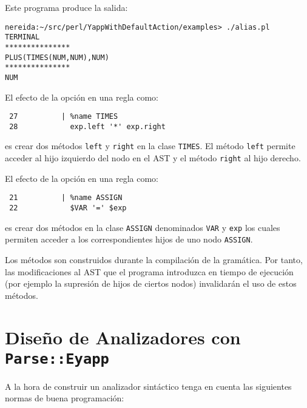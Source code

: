 Este programa produce la salida:
\begin{verbatim}
nereida:~/src/perl/YappWithDefaultAction/examples> ./alias.pl
TERMINAL
***************
PLUS(TIMES(NUM,NUM),NUM)
***************
NUM
\end{verbatim}
El efecto de la opción  en una regla como:
\begin{verbatim}
 27          | %name TIMES
 28            exp.left '*' exp.right
\end{verbatim}
es crear dos métodos \verb|left| y \verb|right| en la clase \verb|TIMES|.
El método \verb|left| permite acceder al hijo izquierdo del nodo en el AST
y el método \verb|right| al hijo derecho.

El efecto de la opción  en una regla como:
\begin{verbatim}
 21          | %name ASSIGN
 22            $VAR '=' $exp
\end{verbatim}
es crear dos métodos en la clase \verb|ASSIGN| denominados
\verb|VAR| y \verb|exp| los cuales permiten acceder a los
correspondientes hijos de uno nodo \verb|ASSIGN|.

Los métodos son construidos durante la compilación de la gramática.
Por tanto, las modificaciones al AST que el programa introduzca en 
tiempo de ejecución (por ejemplo la supresión de hijos de ciertos
nodos) invalidarán el uso de estos métodos.


\section{Diseño de Analizadores con {\tt Parse::Eyapp}}
\label{section:consejoseyapp}
A la hora de construir un analizador sintáctico tenga en cuenta 
las siguientes normas de buena programación:

